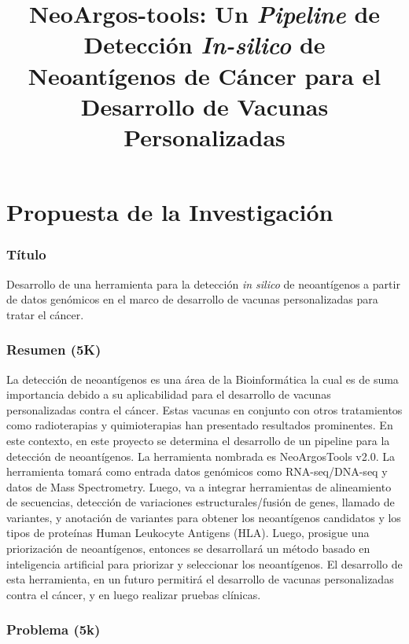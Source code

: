 \documentclass[a4paper,11pt]{article}
\title{ 
	
	NeoArgos-tools: Un \textit{Pipeline} de Detección \textit{In-silico} de Neoantígenos de Cáncer para el Desarrollo de Vacunas Personalizadas
}
\author{}
\date{}
\begin{document}
	

	
	
	
	
	
	
	

\part*{Propuesta de la Investigación}

\section{Título}
Desarrollo de una herramienta  para la detección \textit{in silico} de neoantígenos a partir de datos genómicos en el marco de desarrollo de vacunas personalizadas para tratar el cáncer.

\section{Resumen (5K)}
La detección de neoantígenos es una área de la Bioinformática la cual es de suma importancia debido a su aplicabilidad para el desarrollo de vacunas personalizadas contra el cáncer. Estas vacunas en conjunto con otros tratamientos como radioterapias y quimioterapias han presentado resultados prominentes. En este contexto, en este proyecto se determina el desarrollo de un pipeline para la detección de neoantígenos. La herramienta nombrada es NeoArgosTools v2.0. La herramienta tomará como entrada datos genómicos como RNA-seq/DNA-seq y datos de Mass Spectrometry. Luego, va a integrar herramientas de alineamiento de secuencias, detección de variaciones estructurales/fusión de genes, llamado de variantes, y anotación de variantes para obtener los neoantígenos candidatos y los tipos de proteínas Human Leukocyte Antigens (HLA). Luego, prosigue una priorización de neoantígenos, entonces se desarrollará un método basado en inteligencia artificial para priorizar y seleccionar los neoantígenos. El desarrollo de esta herramienta, en un futuro permitirá el desarrollo de vacunas personalizadas contra el cáncer, y en luego realizar pruebas clínicas.

\section{Problema (5k) }
\end{document}
